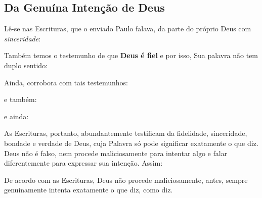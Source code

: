     \subsection{Da Genuína Intenção de Deus}

    Lê-se nas Escrituras, que o enviado Paulo falava, da parte do próprio Deus com \emph{sinceridade}:


    Também temos o testemunho de que \textbf{Deus é fiel} e por isso, Sua palavra não tem duplo sentido:


    Ainda, corrobora com tais testemunhos:


    \noindent e também:


    \noindent e ainda:


    As Escrituras, portanto, abundantemente testificam da fidelidade, sinceridade, bondade e verdade de Deus,  cuja  Palavra  só
    pode significar exatamente o que diz. Deus não é falso, nem procede maliciosamente para intentar algo e falar diferentemente
    para expressar sua intenção. Assim:

    \begin{PRI}
        \label{pri.genuina}
        De acordo com as Escrituras, Deus não procede maliciosamente, antes, sempre genuinamente intenta  exatamente
        o que diz, como diz.
    \end{PRI}


